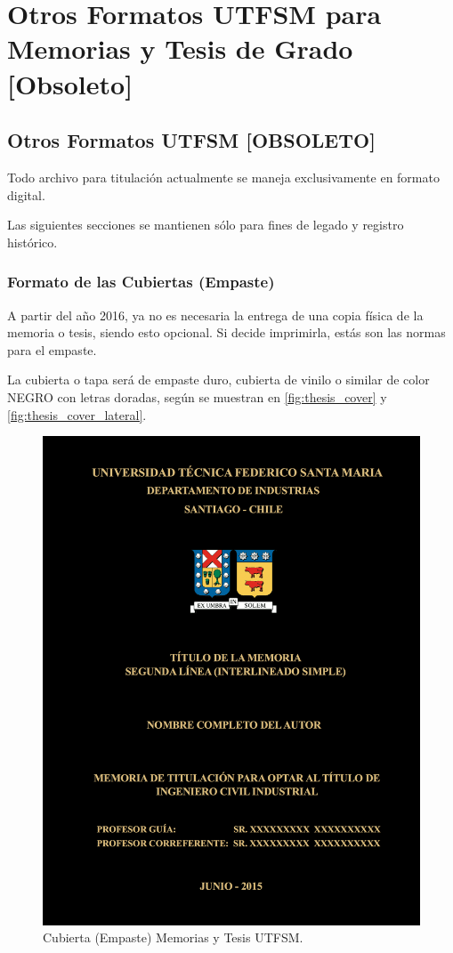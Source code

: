 
\chapter{Otros Formatos UTFSM para Memorias y Tesis de Grado [Obsoleto]}

\section{Otros Formatos UTFSM [OBSOLETO]}

Todo archivo para titulación actualmente se maneja exclusivamente en formato digital.

Las siguientes secciones se mantienen sólo para fines de legado y registro histórico.

\subsection{Formato de las Cubiertas (Empaste)}

A partir del año 2016, ya no es necesaria la entrega de una copia física de la memoria o tesis, siendo esto opcional. Si decide imprimirla, estás son las normas para el empaste.

La cubierta o tapa será de empaste duro, cubierta de vinilo o similar de color NEGRO con letras doradas, según se muestran en \autoref{fig:thesis_cover} y \autoref{fig:thesis_cover_lateral}.

\begin{figure}[ht!]
\centering
\includegraphics[width=.7\textwidth]{figures/thesis_cover.png}
\caption{Cubierta (Empaste) Memorias y Tesis UTFSM.}
\label{fig:thesis_cover}
\end{figure}

